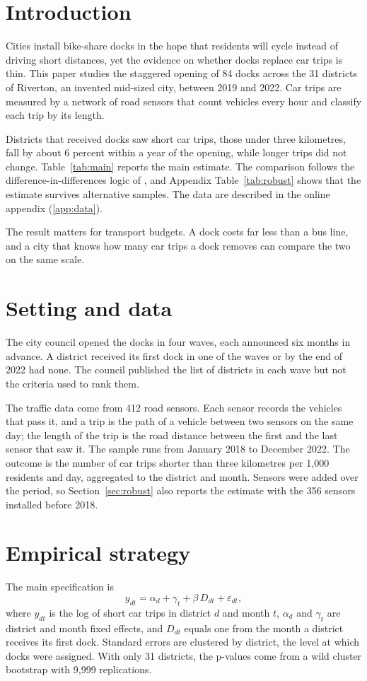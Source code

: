 \section{Introduction}\label{sec:intro}
Cities install bike-share docks in the hope that residents will cycle instead of driving short distances, yet the evidence on whether docks replace car trips is thin. This paper studies the staggered opening of 84 docks across the 31 districts of Riverton, an invented mid-sized city, between 2019 and 2022. Car trips are measured by a network of road sensors that count vehicles every hour and classify each trip by its length.

Districts that received docks saw short car trips, those under three kilometres, fall by about 6 percent within a year of the opening, while longer trips did not change. Table~\ref{tab:main} reports the main estimate. The comparison follows the difference-in-differences logic of \citet{card1994minimum}, and Appendix Table~\ref{tab:robust} shows that the estimate survives alternative samples. The data are described in the online appendix (\ref{app:data}).

The result matters for transport budgets. A dock costs far less than a bus line, and a city that knows how many car trips a dock removes can compare the two on the same scale.

\section{Setting and data}\label{sec:data}
The city council opened the docks in four waves, each announced six months in advance. A district received its first dock in one of the waves or by the end of 2022 had none. The council published the list of districts in each wave but not the criteria used to rank them.

The traffic data come from 412 road sensors. Each sensor records the vehicles that pass it, and a trip is the path of a vehicle between two sensors on the same day; the length of the trip is the road distance between the first and the last sensor that saw it. The sample runs from January 2018 to December 2022. The outcome is the number of car trips shorter than three kilometres per 1,000 residents and day, aggregated to the district and month. Sensors were added over the period, so Section~\ref{sec:robust} also reports the estimate with the 356 sensors installed before 2018.

\section{Empirical strategy}\label{sec:strategy}
The main specification is
\begin{equation}
  y_{dt} = \alpha_d + \gamma_t + \beta\, D_{dt} + \varepsilon_{dt},
\end{equation}
where $y_{dt}$ is the log of short car trips in district $d$ and month $t$, $\alpha_d$ and $\gamma_t$ are district and month fixed effects, and $D_{dt}$ equals one from the month a district receives its first dock. Standard errors are clustered by district, the level at which docks were assigned. With only 31 districts, the p-values come from a wild cluster bootstrap with 9,999 replications.

